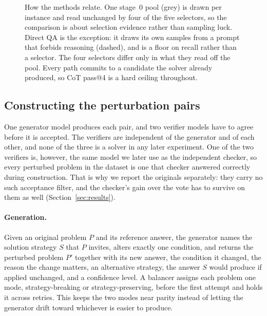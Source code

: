 \documentclass[letterpaper]{article} %
\begin{document}
\begin{figure}[t]
\caption{How the methods relate. One stage~0 pool (grey) is drawn per instance
and read unchanged by four of the five selectors, so the comparison is about
selection evidence rather than sampling luck. Direct QA is the exception: it
draws its own samples from a prompt that forbids reasoning (dashed), and is a
floor on recall rather than a selector. The four selectors differ only in what
they read off the pool. Every path commits to a candidate the solver already
produced, so CoT pass@4 is a hard ceiling throughout.}
\label{fig:overview}
\end{figure}

\subsection{Constructing the perturbation pairs}
\label{sec:construction}

One generator model produces each pair, and two verifier models have to agree
before it is accepted. The verifiers are independent of the generator and of
each other, and none of the three is a solver in any later experiment. One of
the two verifiers is, however, the same model we later use as the independent
checker, so every perturbed problem in the dataset is one that checker answered
correctly during construction. That is why we report the originals separately:
they carry no such acceptance filter, and the checker's gain over the
vote has to survive on them as well (Section~\ref{sec:results}).

\paragraph{Generation.}
Given an original problem $P$ and its reference answer, the generator names the
solution strategy $S$ that $P$ invites, alters exactly one condition, and
returns the perturbed problem $P'$ together with its new answer, the condition
it changed, the reason the change matters, an alternative strategy, the answer
$S$ would produce if applied unchanged, and a confidence level. A balancer
assigns each problem one mode, strategy-breaking or strategy-preserving,
before the first attempt and holds it across retries. This keeps the two modes
near parity instead of letting the generator drift toward whichever is easier
to produce.
\end{document}
